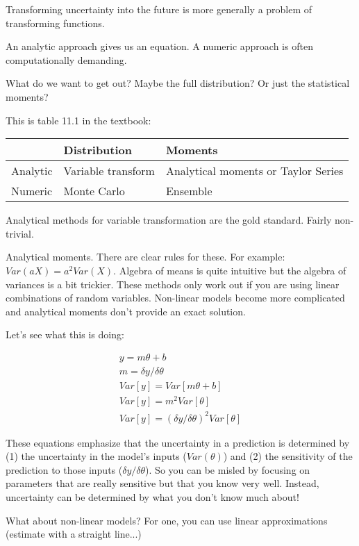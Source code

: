 \documentclass[12pt, oneside]{article}   	%
\begin{document}
Transforming uncertainty into the future is more generally a problem of transforming functions.

An analytic approach gives us an equation. A numeric approach is often computationally demanding.

What do we want to get out? Maybe the full distribution? Or just the statistical moments?

This is table 11.1 in the textbook: 

\begin{table}[h!]
\begin{tabular}{l|l|l|}
 & Distribution & Moments  \\ \hline
Analytic & Variable transform  & Analytical moments or Taylor Series    \\ \hline
Numeric & Monte Carlo & Ensemble  \\ \hline
\end{tabular}
\end{table}

Analytical methods for variable transformation are the gold standard. Fairly non-trivial.

Analytical moments. There are clear rules for these. For example: $Var(aX) = a^2 Var(X)$. Algebra of means is quite intuitive but the algebra of variances is a bit trickier. These methods only work out if you are using linear combinations of random variables. Non-linear models become more complicated and analytical moments don't provide an exact solution.

Let's see what this is doing:

\begin{align} y = m \theta + b \\
m = \delta y / \delta \theta \\
Var[y] = Var[m \theta + b ] \\
Var[y] = m^2 Var[\theta] \\
Var[y] = (\delta y / \delta \theta)^2 Var[ \theta ]
\end{align}

These equations emphasize that the uncertainty in a prediction is determined by (1) the uncertainty in the model's inputs ($Var(\theta)$) and (2) the sensitivity of the prediction to those inputs ($\delta y / \delta \theta$). So you can be misled by focusing on parameters that are really sensitive but that you know very well. Instead, uncertainty can be determined by what you don't know much about!

What about non-linear models? For one, you can use linear approximations (estimate with a straight line...)
\end{document}
